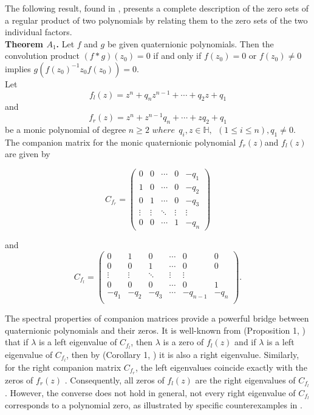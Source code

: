 \documentclass [12pt]{article}
\begin{document}
The following result, found in \cite{GS}, presents a complete description of the zero sets of a regular product of two polynomials by relating them to the zero sets of the two individual factors.\\
\textbf{Theorem $A_1$.} Let $f$ and $g$ be given quaternionic polynomials. Then the convolution product $(f*g)(z_0)=0$ if and only if $f(z_0)=0$ or $f(z_0)\neq 0$ implies $g(f(z_0)^{-1}z_0f(z_0))=0$.\\

\noindent Let 
  $$f_l(z) =  z^n + q_{n} z^{n-1} + \cdots + q_{2}z+q_{1}$$ and
 $$f_r(z) = z^n  + z^{n-1} q_{n} + \cdots + zq_{2}+q_{1}  
$$ be a monic polynomial of degree $n\ge 2$ ${where}~~ q_{i}, z \in\mathbb{H},~~ (1 \le i \le n), q_{1}\ne 0.$
 \\ The  companion matrix for the monic quaternionic polynomial \(f_{r}(z)\)and \(f_{l}(z)\) are given by

\[
C_{f_r} = 
\begin{pmatrix}
0 & 0 & \cdots & 0 & -q_{1} \\
1 & 0 & \cdots & 0 & -q_{2} \\
0 & 1 & \cdots & 0 & -q_{3} \\
\vdots & \vdots & \ddots & \vdots & \vdots \\
0 & 0 & \cdots & 1 & -q_{n}
\end{pmatrix}
\]

and \[
C_{f_l} = 
\begin{pmatrix}
0 & 1 & 0 & \cdots & 0 & 0 \\
0 & 0 & 1& \cdots & 0 & 0 \\

\vdots & \vdots & \ddots & \vdots & \vdots \\
0 & 0 & 0 &  \cdots & 0 & 1\\
-q_{1}& -q_{2}& -q_{3} & \cdots & -q_{n-1} & -q_{n}\\
\end{pmatrix}.
\]

\noindent The spectral properties of companion matrices provide a powerful bridge between quaternionic polynomials and their zeros. It is well-known from (Proposition 1, \cite{SR}) that if $\lambda$ is a left eigenvalue of $C_{f_{l}}$, then $\lambda$ is a zero of $f_{l}(z)$ and if $\lambda$ is a left eigenvalue of $C_{f_{l}}$, then by (Corollary 1, {\cite{SR}}) it is also a right eigenvalue. 
Similarly, for the right companion matrix $C_{f_r}$, the left eigenvalues coincide exactly with the zeros of $f_r(z)$ \cite{SR}. Consequently, all zeros of $f_l(z)$ are the right eigenvalues of $C_{f_l}$. However, the converse does not hold in general, not every right eigenvalue of $C_{f_l}$ corresponds to a polynomial zero, as illustrated by specific counterexamples in \cite{KI}.
\end{document}
